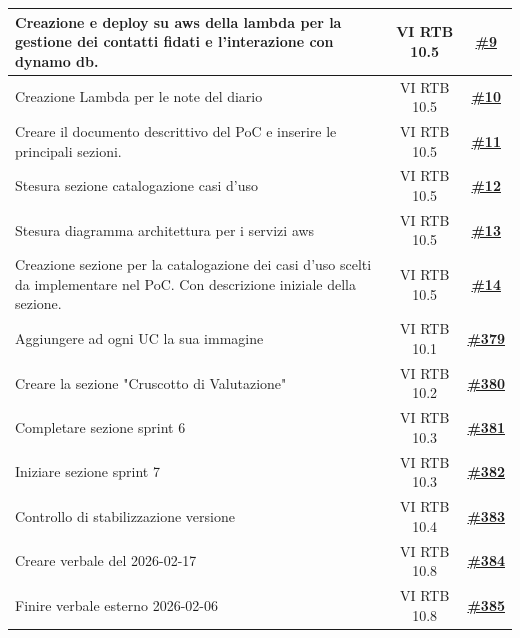 \documentclass[a4paper,12pt]{article}
\begin{document}
\begin{longtable}{|p{}|c|c|}
\hline
\rowcolor{white}
Creazione e deploy su aws della lambda per la gestione dei contatti fidati e l'interazione con dynamo db. & VI RTB 10.5 & \href{https://github.com/SWE-BitByBit/project-PoC/issues/9}{\textbf{\#9}} \\
\hline
\rowcolor{gray!20}
Creazione Lambda per le note del diario & VI RTB 10.5 & \href{https://github.com/SWE-BitByBit/project-PoC/issues/10}{\textbf{\#10}} \\
\hline
\rowcolor{white}
Creare il documento descrittivo del PoC e inserire le principali sezioni. & VI RTB 10.5 & \href{https://github.com/SWE-BitByBit/project-PoC/issues/11}{\textbf{\#11}} \\
\hline
\rowcolor{gray!20}
Stesura sezione catalogazione casi d'uso & VI RTB 10.5 & \href{https://github.com/SWE-BitByBit/project-PoC/issues/12}{\textbf{\#12}} \\
\hline
\rowcolor{white}
Stesura diagramma architettura per i servizi aws & VI RTB 10.5 & \href{https://github.com/SWE-BitByBit/project-PoC/issues/13}{\textbf{\#13}} \\
\hline
\rowcolor{gray!20}
Creazione sezione per la catalogazione dei casi d'uso scelti da implementare nel PoC. Con descrizione iniziale della sezione. & VI RTB 10.5 & \href{https://github.com/SWE-BitByBit/project-PoC/issues/14}{\textbf{\#14}} \\
\hline
\rowcolor{white}
Aggiungere ad ogni UC la sua immagine & VI RTB 10.1 & \href{https://github.com/SWE-BitByBit/SWE-docs/issues/379}{\textbf{\#379}} \\
\hline
\rowcolor{gray!20}
Creare la sezione "Cruscotto di Valutazione" & VI RTB 10.2 & \href{https://github.com/SWE-BitByBit/SWE-docs/issues/380}{\textbf{\#380}} \\
\hline
\rowcolor{white}
Completare sezione sprint 6 & VI RTB 10.3 & \href{https://github.com/SWE-BitByBit/SWE-docs/issues/381}{\textbf{\#381}} \\
\hline
\rowcolor{gray!20}
Iniziare sezione sprint 7 & VI RTB 10.3 & \href{https://github.com/SWE-BitByBit/SWE-docs/issues/382}{\textbf{\#382}} \\
\hline
\rowcolor{white}
Controllo di stabilizzazione versione & VI RTB 10.4 & \href{https://github.com/SWE-BitByBit/SWE-docs/issues/383}{\textbf{\#383}} \\
\hline
\rowcolor{gray!20}
Creare verbale del 2026-02-17 & VI RTB 10.8 & \href{https://github.com/SWE-BitByBit/SWE-docs/issues/384}{\textbf{\#384}} \\
\hline
\rowcolor{white}
Finire verbale esterno 2026-02-06 & VI RTB 10.8 & \href{https://github.com/SWE-BitByBit/SWE-docs/issues/385}{\textbf{\#385}} \\

\end{longtable}
\end{document}
